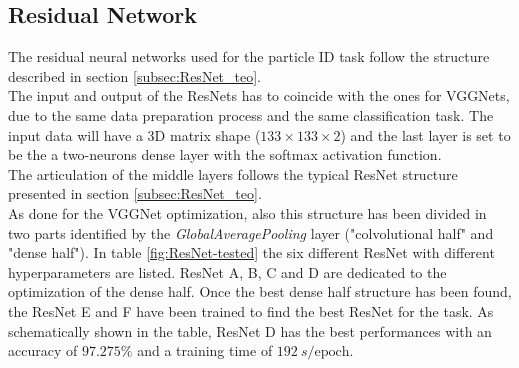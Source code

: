 \subsection{Residual Network}
The residual neural networks used for the particle ID task follow the structure described in section \ref{subsec:ResNet_teo}.\\
The input and output of the ResNets has to coincide with the ones for VGGNets, due to the same data preparation process and the same classification task. The input data will have a 3D matrix shape ($133\times 133\times 2$) and the last layer is set to be the a two-neurons dense layer with the softmax activation function.\\
The articulation of the middle layers follows the typical ResNet structure presented in section \ref{subsec:ResNet_teo}.\\
As done for the VGGNet optimization, also this structure has been divided in two parts identified by the \textit{GlobalAveragePooling} layer ("colvolutional half" and "dense half"). In table \ref{fig:ResNet-tested} the six different ResNet with different hyperparameters are listed. ResNet A, B, C and D are dedicated to the optimization of the dense half. Once the best dense half structure has been found, the ResNet E and F have been trained to find the best ResNet for the task. As schematically shown in the table, ResNet D has the best performances with an accuracy of $97.275\%$ and a training time of $192\ s/\text{epoch}$.\\


